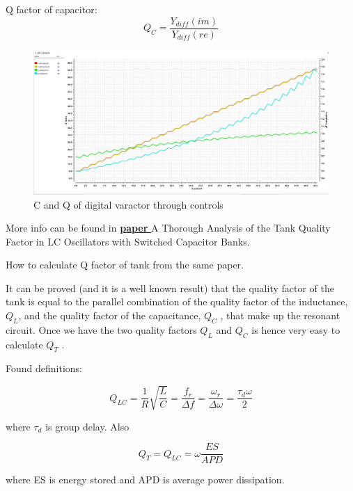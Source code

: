 \documentclass{article}
\begin{document}
Q factor of capacitor:
\begin{equation}
	Q_C = \dfrac{Y_{diff} (im)}{ Y_{diff} (re)}
\end{equation}

\begin{figure}[h!]
	\includegraphics[width=\linewidth]{Figures/Dvaractor.png}
	\caption{C and Q of digital varactor through controls}
	\label{fig:dvaracator}
\end{figure}

More info can be found in  \href{https://ieeexplore.ieee.org/abstract/document/5537949}{\textbf{paper }} A Thorough Analysis of the Tank Quality Factor in LC Oscillators with Switched Capacitor Banks.

How to calculate Q factor of tank from the same paper.

\begin{info}
It can be proved (and it is a well known result) that the quality factor of the tank is equal to the parallel combination of the quality factor of the inductance, $Q_L$, and the quality factor of the capacitance, $Q_C$ , that make up the resonant circuit. Once we have the two quality factors $Q_L$ and $Q_C$ is hence very easy to calculate $Q_T$ .
\end{info}


Found definitions:

\begin{equation}
	Q_{LC} = \dfrac{1}{R}\sqrt{\dfrac{L}{C}} = \frac{f_r}{\Delta f} = \frac{\omega _r}{\Delta \omega} = \dfrac{\tau _d \omega}{2}
\end{equation}

where $\tau _d$ is group delay. Also


\begin{equation}
	Q_{T} = Q_{LC} = \omega \dfrac{ES}{APD}
\end{equation}

where ES is energy stored and APD is average power dissipation.
\end{document}
